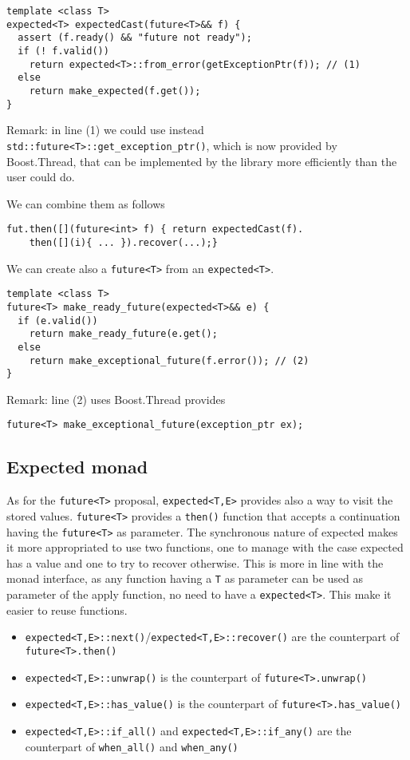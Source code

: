 \documentclass[a4paper,10pt]{article}
\newcommand{\cpp}[1]{\lstinline{#1}}
\begin{document}
\begin{lstlisting}
template <class T>
expected<T> expectedCast(future<T>&& f) {
  assert (f.ready() && "future not ready");
  if (! f.valid()) 
    return expected<T>::from_error(getExceptionPtr(f)); // (1)
  else 
    return make_expected(f.get());
}
\end{lstlisting}

Remark: in line (1) we could use instead \cpp{std::future<T>::get_exception_ptr()}, which is now provided by Boost.Thread, that can be implemented by the library more efficiently than the user could do.

We can combine them as follows

\begin{lstlisting}
fut.then([](future<int> f) { return expectedCast(f).
	then([](i){ ... }).recover(...);}
\end{lstlisting}

We can create also a \cpp{future<T>} from an \cpp{expected<T>}.

\begin{lstlisting}
template <class T>
future<T> make_ready_future(expected<T>&& e) {
  if (e.valid()) 
    return make_ready_future(e.get();
  else 
    return make_exceptional_future(f.error()); // (2)
}
\end{lstlisting}

Remark: line (2) uses Boost.Thread provides

\begin{lstlisting}
future<T> make_exceptional_future(exception_ptr ex);
\end{lstlisting}


\subsection{Expected monad}

As for the \cpp{future<T>} proposal, \cpp{expected<T,E>} provides also a way to visit the stored values.
\cpp{future<T>} provides a \cpp{then()} function that accepts a continuation having the \cpp{future<T>} as parameter. The synchronous nature of expected makes it more appropriated to use two functions, one to manage with the case expected has a value and one to try to recover otherwise. This is more in line with the monad interface, as any function having a \cpp{T} as parameter can be used as parameter of the apply function, no need to have a \cpp{expected<T>}. This make it easier to reuse functions. 

\begin{itemize}
 \item \cpp{expected<T,E>::next()}/\cpp{expected<T,E>::recover()} are the counterpart of \cpp{future<T>.then()}
 \item \cpp{expected<T,E>::unwrap()} is the counterpart of \cpp{future<T>.unwrap()}
 \item \cpp{expected<T,E>::has_value()} is the counterpart of \cpp{future<T>.has_value()}
 \item \cpp{expected<T,E>::if_all()} and \cpp{expected<T,E>::if_any()} are the counterpart of \cpp{when_all()} and \cpp{when_any()}
\end{itemize}
\end{document}
